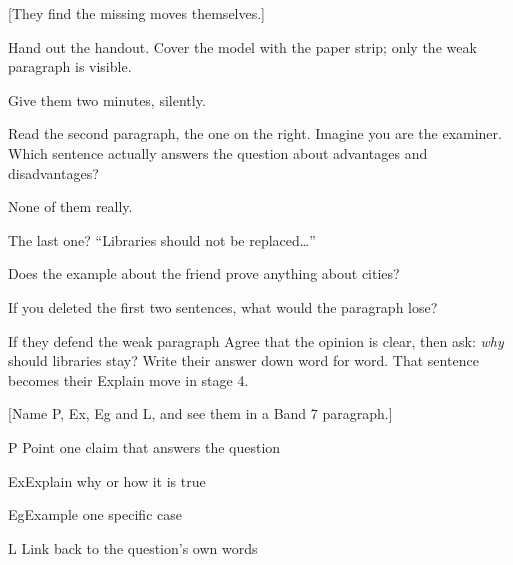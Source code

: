 \documentclass{tutordesk}
\begin{document}
[They find the missing moves themselves.]

\begin{action}
  \item Hand out the handout. Cover the model with the paper strip; only the weak paragraph is visible.
  \item Give them two minutes, silently.
\end{action}

\begin{say}
Read the second paragraph, the one on the right. Imagine you are the examiner.
\beat Which sentence actually answers the question about advantages and disadvantages?
\end{say}

\begin{expect}
  \item None of them really.
  \item The last one? \enquote{Libraries should not be replaced\dots}
\end{expect}

\begin{probe}
  \item Does the example about the friend prove anything about cities?
  \item If you deleted the first two sentences, what would the paragraph lose?
\end{probe}

\begin{fallback}{If they defend the weak paragraph}
Agree that the opinion is clear, then ask: \emph{why} should libraries stay? Write their
answer down word for word. That sentence becomes their Explain move in stage 4.
\end{fallback}

[Name P, Ex, Eg and L, and see them in a Band 7 paragraph.]

\begin{board}
P \enspace Point \quad one claim that answers the question\par
Ex\enspace Explain \quad why or how it is true\par
Eg\enspace Example \quad one specific case\par
L \enspace Link \quad back to the question's own words
\end{board}
\end{document}
